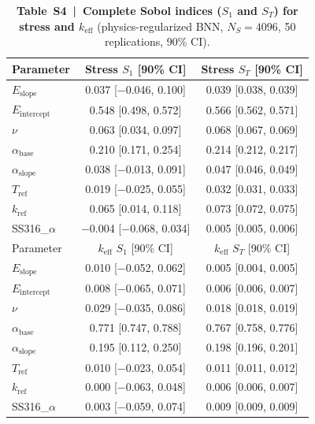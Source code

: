 \documentclass[11pt,a4paper]{article}
\newcommand{\keff}{\ensuremath{k_{\mathrm{eff}}}}
\newcommand{\Eint}{\ensuremath{E_{\mathrm{intercept}}}}
\newcommand{\Eslope}{\ensuremath{E_{\mathrm{slope}}}}
\newcommand{\abase}{\ensuremath{\alpha_{\mathrm{base}}}}
\newcommand{\aslope}{\ensuremath{\alpha_{\mathrm{slope}}}}
\newcommand{\kref}{\ensuremath{k_{\mathrm{ref}}}}
\newcommand{\Tref}{\ensuremath{T_{\mathrm{ref}}}}
\begin{document}
\begin{table}[htbp]
\centering
\caption{\textbf{Table~S4~|~Complete Sobol indices ($S_1$ and $S_T$) for
stress and \keff{}} (physics-regularized BNN, $N_S = 4096$,
50 replications, 90\% CI).}
\label{tab:S4}
\smallskip
\small
\begin{tabular}{lcc}
\toprule
Parameter & Stress $S_1$ [90\% CI] & Stress $S_T$ [90\% CI] \\
\midrule
\Eslope{}    & 0.037 [$-$0.046, 0.100] & 0.039 [0.038, 0.039] \\
\Eint{}      & 0.548 [0.498, 0.572]    & 0.566 [0.562, 0.571] \\
$\nu$        & 0.063 [0.034, 0.097]    & 0.068 [0.067, 0.069] \\
\abase{}     & 0.210 [0.171, 0.254]    & 0.214 [0.212, 0.217] \\
\aslope{}    & 0.038 [$-$0.013, 0.091] & 0.047 [0.046, 0.049] \\
\Tref{}      & 0.019 [$-$0.025, 0.055] & 0.032 [0.031, 0.033] \\
\kref{}      & 0.065 [0.014, 0.118]    & 0.073 [0.072, 0.075] \\
SS316\_$\alpha$ & $-$0.004 [$-$0.068, 0.034] & 0.005 [0.005, 0.006] \\
\midrule
Parameter & \keff{} $S_1$ [90\% CI] & \keff{} $S_T$ [90\% CI] \\
\midrule
\Eslope{}    & 0.010 [$-$0.052, 0.062] & 0.005 [0.004, 0.005] \\
\Eint{}      & 0.008 [$-$0.065, 0.071] & 0.006 [0.006, 0.007] \\
$\nu$        & 0.029 [$-$0.035, 0.086] & 0.018 [0.018, 0.019] \\
\abase{}     & 0.771 [0.747, 0.788]    & 0.767 [0.758, 0.776] \\
\aslope{}    & 0.195 [0.112, 0.250]    & 0.198 [0.196, 0.201] \\
\Tref{}      & 0.010 [$-$0.023, 0.054] & 0.011 [0.011, 0.012] \\
\kref{}      & 0.000 [$-$0.063, 0.048] & 0.006 [0.006, 0.007] \\
SS316\_$\alpha$ & 0.003 [$-$0.059, 0.074] & 0.009 [0.009, 0.009] \\
\bottomrule
\end{tabular}
\end{table}
\end{document}
